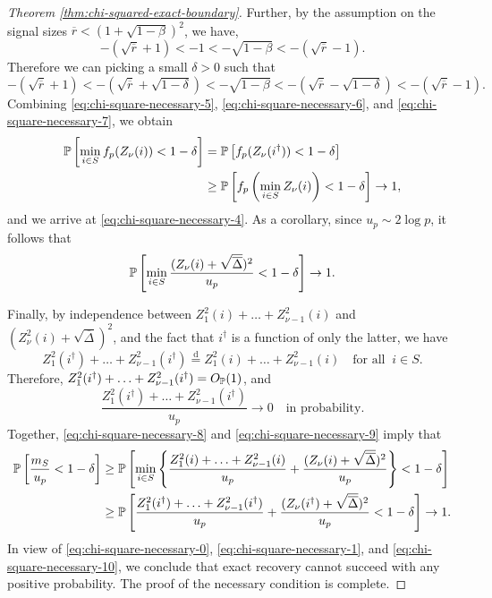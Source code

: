 \begin{proof}[Theorem \ref{thm:chi-squared-exact-boundary}]
Further, by the assumption on the signal sizes $\overline{r} < (1+\sqrt{1-\beta})^2$, we have,
\begin{equation*}
    -(\sqrt{\overline{r}}+1) < -1 <- \sqrt{1-\beta} < - (\sqrt{\overline{r}}-1).
\end{equation*}
Therefore we can picking a small $\delta>0$ such that 
\begin{equation} \label{eq:chi-square-necessary-7}
    -(\sqrt{\overline{r}}+1) < -(\sqrt{\overline{r}}+\sqrt{1-\delta})
    < - \sqrt{1-\beta}
    < - (\sqrt{\overline{r}}-\sqrt{1-\delta})
    < - (\sqrt{\overline{r}}-1).
\end{equation}
Combining \eqref{eq:chi-square-necessary-5}, \eqref{eq:chi-square-necessary-6}, and \eqref{eq:chi-square-necessary-7}, we obtain
\begin{align*}
    \P\left[\min_{i\in S} f_p(Z_\nu(i)) < 1-\delta\right]
    &= \P\left[ f_p(Z_\nu(i^\dagger)) < 1-\delta \right] \\
    &\ge \P\left[ f_p\left(\min_{i\in S}Z_\nu(i)\right) < 1-\delta \right] \to 1,
\end{align*}
and we arrive at \eqref{eq:chi-square-necessary-4}.
As a corollary, since $u_p\sim2\log{p}$, it follows that
\begin{equation} \label{eq:chi-square-necessary-8}
    \P\left[\min_{i\in S}\frac{(Z_\nu(i) + \sqrt{\overline{\Delta}})^2}{u_p} < 1-\delta\right]\to1.
\end{equation}

Finally, by independence between $Z_1^2(i)+\ldots+Z_{\nu-1}^2(i)$ and $(Z_\nu^2(i)+\sqrt{\overline{\Delta}})^2$, and the fact that $i^\dagger$ is a function of only the latter, we have
$$
Z_1^2(i^\dagger)+\ldots+Z_{\nu-1}^2(i^\dagger) 
\stackrel{\mathrm{d}}{=} Z_1^2(i)+\ldots+Z_{\nu-1}^2(i) 
\quad \text{for all} \;\; i\in S.
$$
Therefore, $Z_1^2(i^\dagger)+\ldots+Z_{\nu-1}^2(i^\dagger) = O_\P(1)$, and 
\begin{equation} \label{eq:chi-square-necessary-9}
    \frac{Z_1^2(i^\dagger)+\ldots+Z_{\nu-1}^2(i^\dagger)}{u_p} \to 0 \quad \text{in probability}. 
\end{equation}
Together, \eqref{eq:chi-square-necessary-8} and \eqref{eq:chi-square-necessary-9} imply that
\begin{align}
    \P\left[\frac{m_S}{u_p}<1-\delta\right]
    &\ge \P\left[\min_{i\in S}\left\{\frac{Z_1^2(i) + \ldots + Z_{\nu-1}^2(i)}{u_p} + \frac{(Z_\nu(i) + \sqrt{\overline{\Delta}})^2}{u_p}\right\} < 1-\delta\right] \nonumber \\
    &\ge \P\left[\frac{Z_1^2(i^\dagger) + \ldots + Z_{\nu-1}^2(i^\dagger)}{u_p} + \frac{(Z_\nu(i^\dagger) + \sqrt{\overline{\Delta}})^2}{u_p} < 1-\delta\right] \to 1. \label{eq:chi-square-necessary-10}
\end{align}
In view of \eqref{eq:chi-square-necessary-0}, \eqref{eq:chi-square-necessary-1}, and \eqref{eq:chi-square-necessary-10}, we conclude that exact recovery cannot succeed with any positive probability.
The proof of the necessary condition is complete.
\end{proof}

